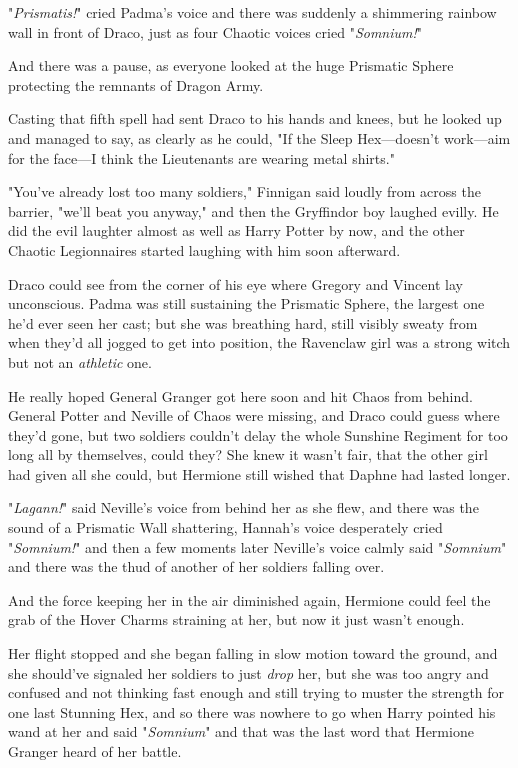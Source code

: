 "\emph{Prismatis!}" cried Padma's voice and there was suddenly a shimmering
rainbow wall in front of Draco, just as four Chaotic voices cried
"\emph{Somnium!}"

And there was a pause, as everyone looked at the huge Prismatic Sphere
protecting the remnants of Dragon Army.

Casting that fifth spell had sent Draco to his hands and knees, but he looked
up and managed to say, as clearly as he could, "If the Sleep Hex---doesn't
work---aim for the face---I think the Lieutenants are wearing metal shirts."

"You've already lost too many soldiers," Finnigan said loudly from across the
barrier, "we'll beat you anyway," and then the Gryffindor boy laughed evilly.
He did the evil laughter almost as well as Harry Potter by now, and the other
Chaotic Legionnaires started laughing with him soon afterward.

Draco could see from the corner of his eye where Gregory and Vincent lay
unconscious. Padma was still sustaining the Prismatic Sphere, the largest one
he'd ever seen her cast; but she was breathing hard, still visibly sweaty from
when they'd all jogged to get into position, the Ravenclaw girl was a strong
witch but not an \emph{athletic} one.

He really hoped General Granger got here soon and hit Chaos from behind.
General Potter and Neville of Chaos were missing, and Draco could guess where
they'd gone, but two soldiers couldn't delay the whole Sunshine Regiment for
too long all by themselves, could they?
\sbreak
She knew it wasn't fair, that the other girl had given all she could, but
Hermione still wished that Daphne had lasted longer.

"\emph{Lagann!}" said Neville's voice from behind her as she flew, and there
was the sound of a Prismatic Wall shattering, Hannah's voice desperately cried
"\emph{Somnium!}" and then a few moments later Neville's voice calmly said
"\emph{Somnium}" and there was the thud of another of her soldiers falling over.

And the force keeping her in the air diminished again, Hermione could feel the
grab of the Hover Charms straining at her, but now it just wasn't enough.

Her flight stopped and she began falling in slow motion toward the ground, and
she should've signaled her soldiers to just \emph{drop} her, but she was too
angry and confused and not thinking fast enough and still trying to muster the
strength for one last Stunning Hex, and so there was nowhere to go when Harry
pointed his wand at her and said "\emph{Somnium}" and that was the last word
that Hermione Granger heard of her battle.
